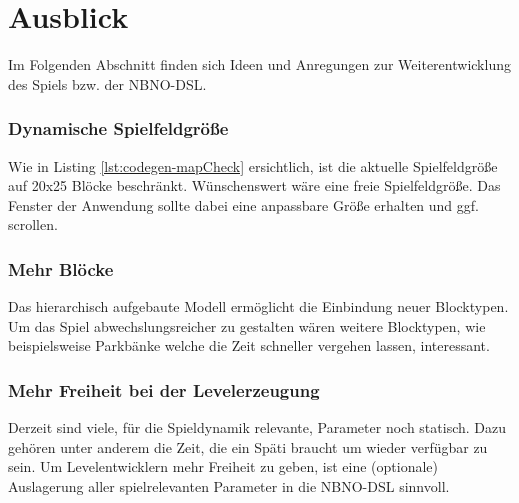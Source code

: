 \section{Ausblick}

Im Folgenden Abschnitt finden sich Ideen und Anregungen zur Weiterentwicklung des Spiels bzw. der NBNO-DSL.

\subsubsection{Dynamische Spielfeldgröße}
Wie in Listing \ref{lst:codegen-mapCheck} ersichtlich, ist die aktuelle Spielfeldgröße auf 20x25 Blöcke beschränkt.
Wünschenswert wäre eine freie Spielfeldgröße.
Das Fenster der Anwendung sollte dabei eine anpassbare Größe erhalten und ggf. scrollen.

\subsubsection{Mehr Blöcke}
Das hierarchisch aufgebaute Modell ermöglicht die Einbindung neuer Blocktypen.
Um das Spiel abwechslungsreicher zu gestalten wären weitere Blocktypen, wie beispielsweise Parkbänke welche die Zeit schneller vergehen lassen, interessant.

\subsubsection{Mehr Freiheit bei der Levelerzeugung}
Derzeit sind viele, für die Spieldynamik relevante, Parameter noch statisch.
Dazu gehören unter anderem die Zeit, die ein Späti braucht um wieder verfügbar zu sein.
Um Levelentwicklern mehr Freiheit zu geben, ist eine (optionale) Auslagerung aller spielrelevanten Parameter in die NBNO-DSL sinnvoll.